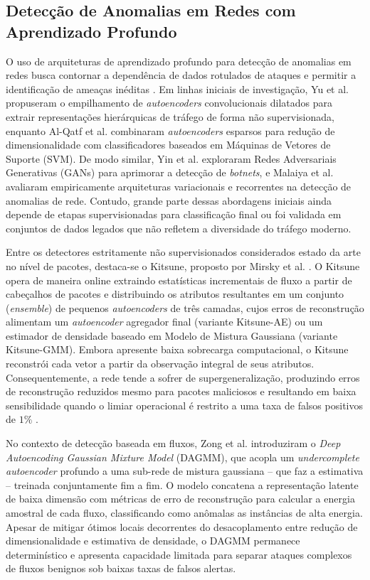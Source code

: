 \documentclass[conference]{IEEEtran}
\begin{document}
\subsection{Detecção de Anomalias em Redes com Aprendizado Profundo}

O uso de arquiteturas de aprendizado profundo para detecção de anomalias em redes busca contornar a dependência de dados rotulados de ataques e permitir a identificação de ameaças inéditas \cite{chalapathy2019, khraisat2019}.
Em linhas iniciais de investigação, Yu et al. \cite{yu2017} propuseram o empilhamento de \textit{autoencoders} convolucionais dilatados para extrair representações hierárquicas de tráfego de forma não supervisionada, enquanto Al-Qatf et al. \cite{alqatf2018} combinaram \textit{autoencoders} esparsos para redução de dimensionalidade com classificadores baseados em Máquinas de Vetores de Suporte (SVM).
De modo similar, Yin et al. \cite{yin2018} exploraram Redes Adversariais Generativas (GANs) para aprimorar a detecção de \textit{botnets}, e Malaiya et al. \cite{malaiya2018} avaliaram empiricamente arquiteturas variacionais e recorrentes na detecção de anomalias de rede.
Contudo, grande parte dessas abordagens iniciais ainda depende de etapas supervisionadas para classificação final ou foi validada em conjuntos de dados legados que não refletem a diversidade do tráfego moderno.

Entre os detectores estritamente não supervisionados considerados estado da arte no nível de pacotes, destaca-se o Kitsune, proposto por Mirsky et al. \cite{mirsky2018}.
O Kitsune opera de maneira online extraindo estatísticas incrementais de fluxo a partir de cabeçalhos de pacotes e distribuindo os atributos resultantes em um conjunto (\textit{ensemble}) de pequenos \textit{autoencoders} de três camadas, cujos erros de reconstrução alimentam um \textit{autoencoder} agregador final (variante Kitsune-AE) ou um estimador de densidade baseado em Modelo de Mistura Gaussiana (variante Kitsune-GMM).
Embora apresente baixa sobrecarga computacional, o Kitsune reconstrói cada vetor a partir da observação integral de seus atributos.
Consequentemente, a rede tende a sofrer de supergeneralização, produzindo erros de reconstrução reduzidos mesmo para pacotes maliciosos e resultando em baixa sensibilidade quando o limiar operacional é restrito a uma taxa de falsos positivos de $1\%$ \cite{hashemi2020}.

No contexto de detecção baseada em fluxos, Zong et al. \cite{zong2018} introduziram o \textit{Deep Autoencoding Gaussian Mixture Model} (DAGMM), que acopla um \textit{undercomplete autoencoder} profundo a uma sub-rede de mistura gaussiana -- que faz a estimativa -- treinada conjuntamente fim a fim.
O modelo concatena a representação latente de baixa dimensão com métricas de erro de reconstrução para calcular a energia amostral de cada fluxo, classificando como anômalas as instâncias de alta energia.
Apesar de mitigar ótimos locais decorrentes do desacoplamento entre redução de dimensionalidade e estimativa de densidade, o DAGMM permanece determinístico e apresenta capacidade limitada para separar ataques complexos de fluxos benignos sob baixas taxas de falsos alertas.
\end{document}
